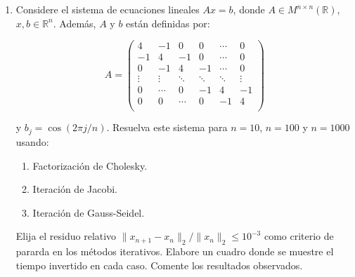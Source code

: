 \documentclass[12pt,letterpaper]{article}
\begin{document}
\begin{enumerate}

\item Considere el sistema de ecuaciones lineales $Ax = b$, donde $A \in M^{n \times n}(\mathbb{R})$, $x,b
\in \mathbb{R}^n$. Adem\'as, $A$ y $b$ est\'an definidas por:

$$
A=\left(\begin{array}{rrrrrr}
         4      & -1     & 0      & 0      & \cdots & 0\\
         -1     &  4     & -1     & 0      & \cdots & 0\\
         0      & -1     & 4      & -1     & \cdots & 0\\
         \vdots & \vdots & \ddots & \ddots & \ddots & \vdots\\
         0      & \cdots & 0      & -1     & 4      & -1\\
         0      & 0      & \cdots & 0      & -1     & 4\\     
        \end{array}\right)
$$

y $b_j = \cos(2\pi j/n)$. Resuelva este sistema para $n=10$, $n=100$ y $n=1000$ usando:
\begin{enumerate}
 \item Factorizaci\'on de Cholesky.
 \item Iteraci\'on de Jacobi.
 \item Iteraci\'on de Gauss-Seidel.
\end{enumerate}
Elija el residuo relativo $\|x_{n+1}- x_n\|_2/\|x_n\|_2 \leq 10^{-3}$ como criterio de pararda en los m\'etodos iterativos.
Elabore un cuadro donde se muestre el tiempo invertido en cada caso. Comente los resultados observados.


\end{enumerate}
\end{document}
